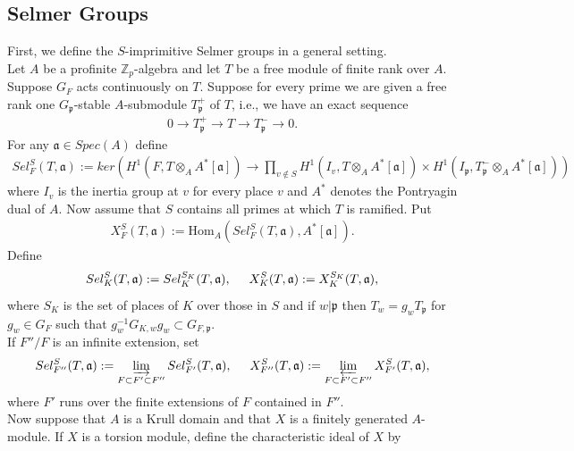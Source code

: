 \documentclass[reqno,10pt]{amsart}
\newcommand{\zp}{\mathbb{Z}_{p}}
\newcommand{\p}{\mathfrak{p}}
\theoremstyle{plain}
\theoremstyle{definition}
\begin{document}
\subsection{Selmer Groups} \label{Wan Sel Gp}
First, we define the $S$-imprimitive Selmer groups in a general setting.
\\
Let $A$ be a profinite $\zp$-algebra and let $T$ be a free module of finite rank over $A$. Suppose $G_F$ acts continuously on $T$. Suppose for every prime we are given a free rank one $G_\p$-stable $A$-submodule $T_\p^+$ of $T$, i.e., we have an exact sequence
\begin{align*}
    0 \rightarrow T_\p^+ \rightarrow T \rightarrow T_\p^- \rightarrow 0.
\end{align*}
For any $\mathfrak{a} \in Spec(A)$ define
\begin{align*}
    Sel^S_F(T,\mathfrak{a}) := ker \left(H^1(F,T \otimes_A A^*[\mathfrak{a}]) \rightarrow \prod_{v \notin S} H^1(I_v,T \otimes_A A^*[\mathfrak{a}]) \times H^1(I_\p,T_\p^- \otimes_A A^*[\mathfrak{a}]) \right)
\end{align*}
where $I_v$ is the inertia group at $v$ for every place $v$ and $A^*$ denotes the Pontryagin dual of $A$. Now assume that $S$ contains all primes at which $T$ is ramified. Put 
\begin{align*}
    X^S_F(T,\mathfrak{a}) := \mathrm{Hom}_A(Sel^S_F(T,\mathfrak{a}),A^*[\mathfrak{a}]).
\end{align*}
Define
\begin{align*}
    Sel^S_K(T,\mathfrak{a}) := Sel^{S_K}_K(T,\mathfrak{a}), \hspace{5mm} X^S_K(T,\mathfrak{a}) := X^{S_K}_K(T,\mathfrak{a}),
\end{align*}
where $S_K$ is the set of places of $K$ over those in $S$ and if $w|\p$ then $T_w = g_wT_\p$ for $g_w \in G_F$ such that $g_w^{-1}G_{K,w}g_w \subset G_{F,\p}$.
\\
If $F''/F$ is an infinite extension, set
\begin{align*}
    Sel^S_{F''}(T,\mathfrak{a}) := \varinjlim_{F \subset F' \subset F''} Sel^S_{F'}(T,\mathfrak{a}), \hspace{5mm} X^S_{F''}(T,\mathfrak{a}) := \varprojlim_{F \subset F' \subset F''} X^S_{F'}(T,\mathfrak{a}),
\end{align*}
where $F'$ runs over the finite extensions of $F$ contained in $F''$.
\\
Now suppose that $A$ is a Krull domain and that $X$ is a finitely generated $A$-module. If $X$ is a torsion module, define the characteristic ideal of $X$ by
\end{document}
